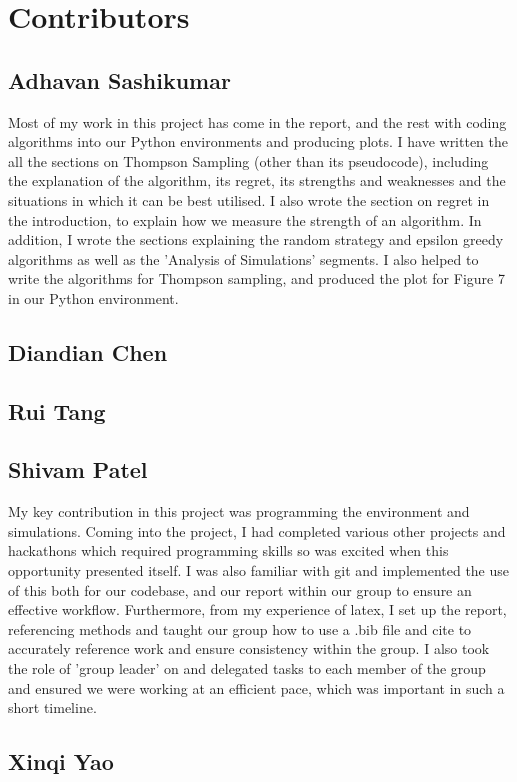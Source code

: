 \section{Contributors}\label{sec:contributors}

\subsection{Adhavan Sashikumar}\label{subsec:adhavan-sashikumar}
Most of my work in this project has come in the report, and the rest with coding algorithms into our Python environments and producing plots. I have written the all the sections on Thompson Sampling (other than its pseudocode), including the explanation of the algorithm, its regret, its strengths and weaknesses and the situations in which it can be best utilised. I also wrote the section on regret in the introduction, to explain how we measure the strength of an algorithm. In addition, I wrote the sections explaining the random strategy and epsilon greedy algorithms as well as the 'Analysis of Simulations' segments. I also helped to write the algorithms for Thompson sampling, and produced the plot for Figure 7 in our Python environment.

\subsection{Diandian Chen}\label{subsec:diandian-chen}

\subsection{Rui Tang}\label{subsec:rui-tang}

\subsection{Shivam Patel}\label{subsec:shivam-patel}
My key contribution in this project was programming the environment and simulations.
Coming into the project, I had completed various other projects and hackathons which required programming skills so was excited when this opportunity presented itself.
I was also familiar with git and implemented the use of this both for our codebase, and our report within our group to ensure an effective workflow.
Furthermore, from my experience of latex, I set up the report, referencing methods and taught our group how to use a .bib file and cite to accurately reference work and ensure consistency within the group.
I also took the role of 'group leader' on and delegated tasks to each member of the group and ensured we were working at an efficient pace, which was important in such a short timeline.

\subsection{Xinqi Yao}\label{subsec:xinqi-yao}
